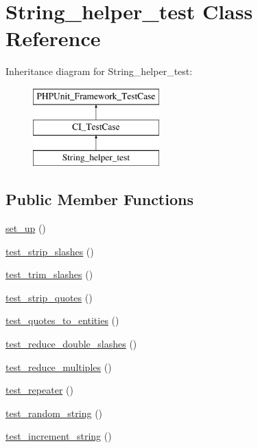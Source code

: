 \hypertarget{class_string__helper__test}{}\section{String\+\_\+helper\+\_\+test Class Reference}
\label{class_string__helper__test}
Inheritance diagram for String\+\_\+helper\+\_\+test\+:\begin{figure}[H]
\begin{center}
\leavevmode
\includegraphics[height=3.000000cm]{class_string__helper__test}
\end{center}
\end{figure}
\subsection*{Public Member Functions}
\begin{DoxyCompactItemize}
\item 
\hyperlink{class_string__helper__test_a69829875c8d4b6ce94908445c4155741}{set\+\_\+up} ()
\item 
\hyperlink{class_string__helper__test_a7ba92c5281c71df7856a37a739bfc85d}{test\+\_\+strip\+\_\+slashes} ()
\item 
\hyperlink{class_string__helper__test_a7c18a9ab91e1007a8a2778eeb29a43d9}{test\+\_\+trim\+\_\+slashes} ()
\item 
\hyperlink{class_string__helper__test_aba68b6e28b417fcdb2ff633e72a9efe7}{test\+\_\+strip\+\_\+quotes} ()
\item 
\hyperlink{class_string__helper__test_a52e161151d508d52ae72b515ff41a213}{test\+\_\+quotes\+\_\+to\+\_\+entities} ()
\item 
\hyperlink{class_string__helper__test_af51e1a0b1b670f44a4c772996544f6ba}{test\+\_\+reduce\+\_\+double\+\_\+slashes} ()
\item 
\hyperlink{class_string__helper__test_a751621b3f90a55b795248a92668cac01}{test\+\_\+reduce\+\_\+multiples} ()
\item 
\hyperlink{class_string__helper__test_a7f04e3b50997afc18be0f06f0627cf58}{test\+\_\+repeater} ()
\item 
\hyperlink{class_string__helper__test_a07ba0819cf01e6c377b2692b6da13fd4}{test\+\_\+random\+\_\+string} ()
\item 
\hyperlink{class_string__helper__test_afd6bf2c868770c711fde84088bacd657}{test\+\_\+increment\+\_\+string} ()
\end{DoxyCompactItemize}
